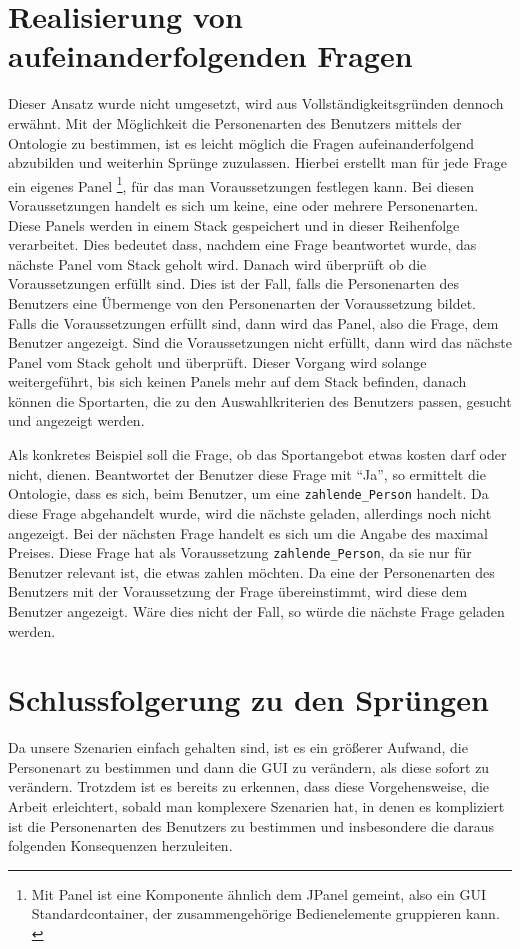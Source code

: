 \section{Realisierung von aufeinanderfolgenden Fragen}
Dieser Ansatz wurde nicht umgesetzt, wird aus Vollständigkeitsgründen dennoch erwähnt. Mit der Möglichkeit die Personenarten des Benutzers mittels der Ontologie zu bestimmen, ist es leicht möglich die Fragen aufeinanderfolgend abzubilden und weiterhin Sprünge zuzulassen. Hierbei erstellt man für jede Frage ein eigenes Panel \footnote{Mit Panel ist eine Komponente ähnlich dem JPanel gemeint, also ein GUI Standardcontainer, der zusammengehörige Bedienelemente gruppieren kann. \autocite{petri:jpanel}}, für das man Voraussetzungen festlegen kann. Bei diesen Voraussetzungen handelt es sich um keine, eine oder mehrere Personenarten. Diese Panels werden in einem Stack gespeichert und in dieser Reihenfolge verarbeitet. Dies bedeutet dass, nachdem eine Frage beantwortet wurde, das nächste Panel vom Stack geholt wird. Danach wird überprüft ob die Voraussetzungen erfüllt sind. Dies ist der Fall, falls die Personenarten des Benutzers eine Übermenge von den Personenarten der Voraussetzung bildet. \\
Falls die Voraussetzungen erfüllt sind, dann wird das Panel, also die Frage, dem Benutzer angezeigt. Sind die Voraussetzungen nicht erfüllt, dann wird das nächste Panel vom Stack geholt und überprüft. Dieser Vorgang wird solange weitergeführt, bis sich keinen Panels mehr auf dem Stack befinden, danach können die Sportarten, die zu den Auswahlkriterien des Benutzers passen, gesucht und angezeigt werden.

Als konkretes Beispiel soll die Frage, ob das Sportangebot etwas kosten darf oder nicht, dienen. Beantwortet der Benutzer diese Frage mit "`Ja"', so ermittelt die Ontologie, dass es sich, beim Benutzer, um eine \lstinline"zahlende_Person" handelt. Da diese Frage abgehandelt wurde, wird die nächste geladen, allerdings noch nicht angezeigt. Bei der nächsten Frage handelt es sich um die Angabe des maximal Preises. Diese Frage hat als Voraussetzung \lstinline"zahlende_Person", da sie nur für Benutzer relevant ist, die etwas zahlen möchten. Da eine der Personenarten des Benutzers mit der Voraussetzung der Frage übereinstimmt, wird diese dem Benutzer angezeigt. Wäre dies nicht der Fall, so würde die nächste Frage geladen werden.

\section{Schlussfolgerung zu den Sprüngen}
Da unsere Szenarien einfach gehalten sind, ist es ein größerer Aufwand, die Personenart zu bestimmen und dann die GUI zu verändern, als diese sofort zu verändern. Trotzdem ist es bereits zu erkennen, dass diese Vorgehensweise, die Arbeit erleichtert, sobald man komplexere Szenarien hat, in denen es kompliziert ist die Personenarten des Benutzers zu bestimmen und insbesondere die daraus folgenden Konsequenzen herzuleiten.